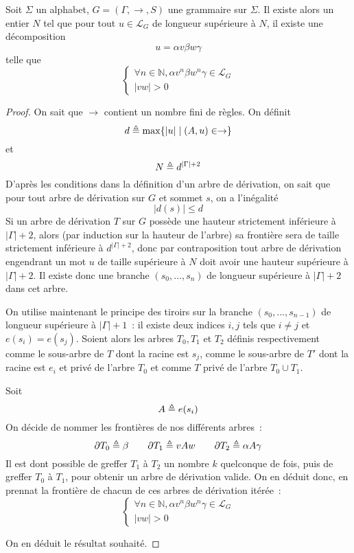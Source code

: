 \begin{lemma}[Itération]
  Soit $\Sigma$ un alphabet, $G = (\Gamma,\to,S)$ une grammaire sur $\Sigma$.
  Il existe alors un entier $N$ tel que pour tout $u \in \mathcal L_G$ de
  longueur supérieure à $N$, il existe une décomposition
  \[u = \alpha v \beta w \gamma\]
  telle que
  \[\begin{cases}
  \forall n \in \mathbb N, \alpha v^n \beta w^n \gamma \in \mathcal L_G\\
  |vw| > 0
  \end{cases}\]
\end{lemma}

\begin{proof}
  On sait que $\to$ contient un nombre fini de règles. On définit
  \[d \triangleq \max \{|u| \mid (A,u) \in \to\}\]
  et
  \[N \triangleq d^{|\Gamma|+2}\]
  D'après les conditions dans la définition d'un arbre de dérivation, on sait
  que pour tout arbre de dérivation sur $G$ et sommet $s$, on a l'inégalité
  \[|d(s)| \leq d\]
  Si un arbre de dérivation $T$ sur $G$ possède une hauteur strictement
  inférieure à $|\Gamma| + 2$, alors (par induction sur la hauteur de l'arbre)
  sa frontière sera de taille strictement inférieure à $d^{|\Gamma| + 2}$, donc
  par contraposition tout arbre de dérivation engendrant un mot $u$ de taille
  supérieure à $N$ doit avoir une hauteur supérieure à $|\Gamma| + 2$. Il existe
  donc une branche $(s_0,\ldots,s_n)$ de longueur supérieure à $|\Gamma| + 2$
  dans cet arbre.

  On utilise maintenant le principe des tiroirs sur la branche
  $(s_0,\ldots,s_{n-1})$ de longueur supérieure à $|\Gamma| + 1$~: il existe
  deux indices $i,j$ tels que $i\neq j$ et $e(s_i) = e(s_j)$. Soient alors les
  arbres $T_0,T_1$ et $T_2$ définis respectivement comme le sous-arbre de $T$
  dont la racine est $s_j$, comme le sous-arbre de $T'$ dont la racine est $e_i$
  et privé de l'arbre $T_0$ et comme $T$ privé de l'arbre $T_0\cup T_1$.

  Soit
  \[A \triangleq e(s_i)\]
  On décide de nommer les frontières de nos différents arbres~:
  \[\partial T_0 \triangleq \beta \qquad \partial T_1 \triangleq vAw \qquad
  \partial T_2 \triangleq \alpha A \gamma\]
  Il est dont possible de greffer $T_1$ à $T_2$ un nombre $k$ quelconque de
  fois, puis de greffer $T_0$ à $T_1$, pour obtenir un arbre de dérivation
  valide. On en déduit donc, en prennat la frontière de chacun de ces arbres de
  dérivation itérée~:
  \[\begin{cases}
  \forall n \in \mathbb N, \alpha v^n \beta w^n \gamma \in \mathcal L_G\\
  |vw| > 0
  \end{cases}\]

  On en déduit le résultat souhaité.
\end{proof}

